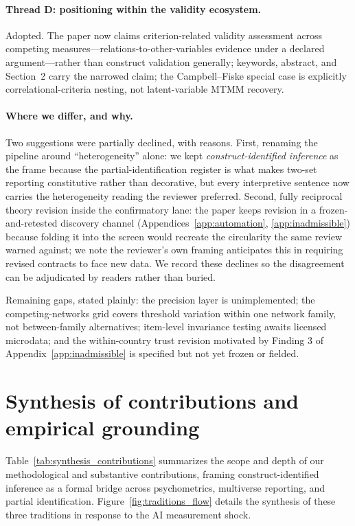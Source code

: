 \documentclass[10pt,letterpaper]{article}
\begin{document}
\paragraph{Thread D: positioning within the validity ecosystem.}
Adopted.
The paper now claims criterion-related validity assessment across competing measures---relations-to-other-variables evidence under a declared argument---rather than construct validation generally; keywords, abstract, and Section~2 carry the narrowed claim; the Campbell--Fiske special case is explicitly correlational-criteria nesting, not latent-variable MTMM recovery.

\paragraph{Where we differ, and why.}
Two suggestions were partially declined, with reasons.
First, renaming the pipeline around ``heterogeneity'' alone: we kept \emph{construct-identified inference} as the frame because the partial-identification register is what makes two-set reporting constitutive rather than decorative, but every interpretive sentence now carries the heterogeneity reading the reviewer preferred.
Second, fully reciprocal theory revision inside the confirmatory lane: the paper keeps revision in a frozen-and-retested discovery channel (Appendices~\ref{app:automation}, \ref{app:inadmissible}) because folding it into the screen would recreate the circularity the same review warned against; we note the reviewer's own framing anticipates this in requiring revised contracts to face new data.
We record these declines so the disagreement can be adjudicated by readers rather than buried.

\medskip
\noindent
Remaining gaps, stated plainly: the precision layer is unimplemented; the competing-networks grid covers threshold variation within one network family, not between-family alternatives; item-level invariance testing awaits licensed microdata; and the within-country trust revision motivated by Finding 3 of Appendix~\ref{app:inadmissible} is specified but not yet frozen or fielded.

\section{Synthesis of contributions and empirical grounding}
\label{app:synthesis}

Table~\ref{tab:synthesis_contributions} summarizes the scope and depth of our methodological and substantive contributions, framing construct-identified inference as a formal bridge across psychometrics, multiverse reporting, and partial identification.
Figure~\ref{fig:traditions_flow} details the synthesis of these three traditions in response to the AI measurement shock.
\end{document}
